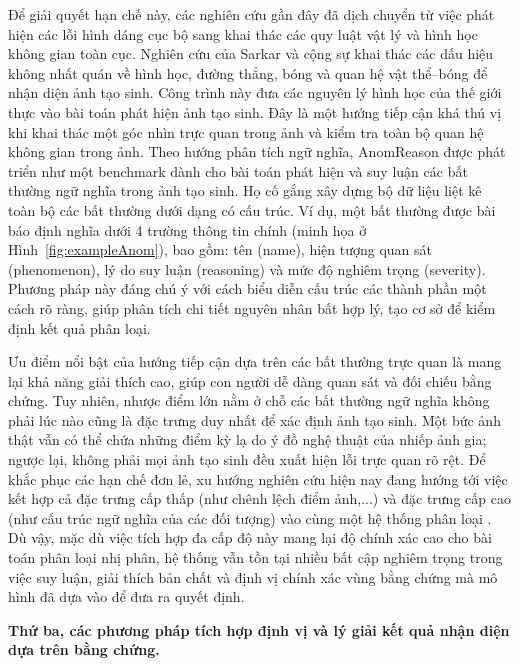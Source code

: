 \documentclass[12pt]{report}
\begin{document}
Để giải quyết hạn chế này, các nghiên cứu gần đây đã dịch chuyển từ việc phát hiện các lỗi hình dáng cục bộ sang khai thác các quy luật vật lý và hình học không gian toàn cục. Nghiên cứu của Sarkar và cộng sự \cite{sarkar2024shadows} khai thác các dấu hiệu không nhất quán về hình học, đường thẳng, bóng và quan hệ vật thể--bóng để nhận diện ảnh tạo sinh. Công trình này đưa các nguyên lý hình học của thế giới thực vào bài toán phát hiện ảnh tạo sinh. Đây là một hướng tiếp cận khá thú vị khi khai thác một góc nhìn trực quan trong ảnh và kiểm tra toàn bộ quan hệ không gian trong ảnh. Theo hướng phân tích ngữ nghĩa, AnomReason \cite{tan2026semantic} được phát triển như một benchmark dành cho bài toán phát hiện và suy luận các bất thường ngữ nghĩa trong ảnh tạo sinh. Họ cố gắng xây dựng bộ dữ liệu liệt kê toàn bộ các bất thường dưới dạng có cấu trúc. Ví dụ, một bất thường được bài báo định nghĩa dưới 4 trường thông tin chính (minh họa ở Hình~\ref{fig:exampleAnom}), bao gồm: tên (name), hiện tượng quan sát (phenomenon), lý do suy luận (reasoning) và mức độ nghiêm trọng (severity). Phương pháp này đáng chú ý với cách biểu diễn cấu trúc các thành phần một cách rõ ràng, giúp phân tích chi tiết nguyên nhân bất hợp lý, tạo cơ sở để kiểm định kết quả phân loại.

Ưu điểm nổi bật của hướng tiếp cận dựa trên các bất thường trực quan là mang lại khả năng giải thích cao, giúp con người dễ dàng quan sát và đối chiếu bằng chứng. Tuy nhiên, nhược điểm lớn nằm ở chỗ các bất thường ngữ nghĩa không phải lúc nào cũng là đặc trưng duy nhất để xác định ảnh tạo sinh. Một bức ảnh thật vẫn có thể chứa những điểm kỳ lạ do ý đồ nghệ thuật của nhiếp ảnh gia; ngược lại, không phải mọi ảnh tạo sinh đều xuất hiện lỗi trực quan rõ rệt. Để khắc phục các hạn chế đơn lẻ, xu hướng nghiên cứu hiện nay đang hướng tới việc kết hợp cả đặc trưng cấp thấp (như chênh lệch điểm ảnh,...) và đặc trưng cấp cao (như cấu trúc ngữ nghĩa của các đối tượng) vào cùng một hệ thống phân loại \cite{shi2026exact, cao2025reveal}. Dù vậy, mặc dù việc tích hợp đa cấp độ này mang lại độ chính xác cao cho bài toán phân loại nhị phân, hệ thống vẫn tồn tại nhiều bất cập nghiêm trọng trong việc suy luận, giải thích bản chất và định vị chính xác vùng bằng chứng mà mô hình đã dựa vào để đưa ra quyết định. 

\textbf{Thứ ba, các phương pháp tích hợp định vị và lý giải kết quả nhận diện dựa trên bằng chứng.}
\end{document}
